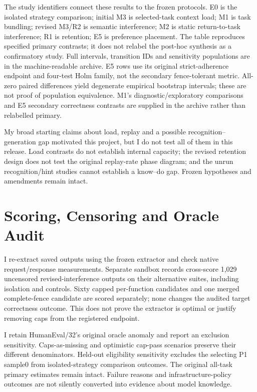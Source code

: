 \documentclass[10pt,a4paper,twocolumn]{article}
\begin{document}
The study identifiers connect these results to the frozen protocols.
E0 is the isolated strategy comparison; initial M3 is selected-task context
load; M1 is task bundling; revised M3/R2 is semantic interference; M2 is static
return-to-task interference; R1 is retention; E5 is preference placement.
The table reproduces specified primary contrasts; it does not relabel the
post-hoc synthesis as a confirmatory study. Full intervals, transition IDs and
sensitivity populations are in the machine-readable archive.
E5 rows use its original strict-adherence endpoint and four-test Holm family,
not the secondary fence-tolerant metric. All-zero paired differences yield
degenerate empirical bootstrap intervals; these are not proof of population
equivalence. M1's diagnostic/exploratory comparisons and E5 secondary
correctness contrasts are supplied in the archive rather than relabelled primary.
\small\normalsize

My broad starting claims about load, replay and a possible recognition--generation
gap motivated this project, but I do not test all of them in this release. Load contrasts
do not establish internal capacity; the revised retention design does not test
the original replay-rate phase diagram; and the unrun recognition/hint studies
cannot establish a know--do gap. Frozen hypotheses and amendments remain intact.

\section{Scoring, Censoring and Oracle Audit}
I re-extract saved outputs using the frozen extractor and check native
request/response measurements. Separate sandbox records cross-score 1,029
uncensored revised-interference outputs on their alternative suites, including
isolation and controls. Sixty capped per-function candidates and one merged
complete-fence candidate are scored separately; none changes the audited target
correctness outcome. This does not prove the extractor is optimal or justify
removing caps from the registered endpoint.

I retain HumanEval/32's original oracle anomaly and report an exclusion
sensitivity. Caps-as-missing and optimistic cap-pass scenarios preserve their
different denominators. Held-out eligibility sensitivity excludes the selecting
P1 sample0 from isolated-strategy comparison outcomes. The original all-task
primary estimates remain intact. Failure reasons and infrastructure-policy
outcomes are not silently converted into evidence about model knowledge.
\end{document}
